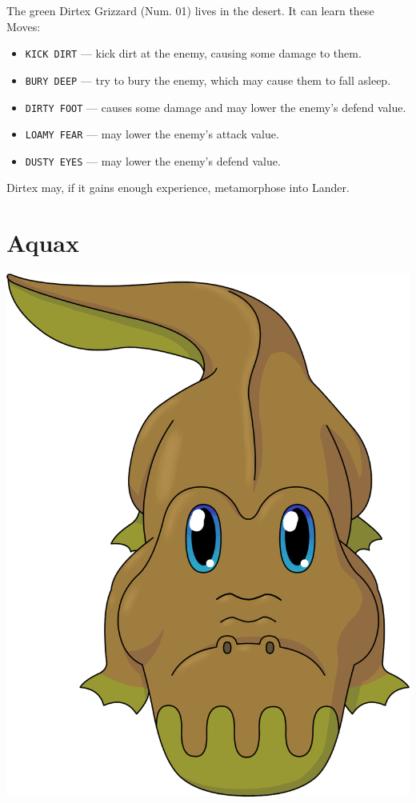 \documentclass[10pt,twocolumn,openany,article]{memoir}
\begin{document}
The green  Dirtex Grizzard (Num. 01)  lives in the desert.  It can learn
these Moves:

\begin{itemize}
\item \texttt{KICK DIRT} --- kick dirt at the enemy, causing some damage
  to them.
\item \texttt{BURY DEEP} --- try to bury the enemy, which may cause them
  to fall asleep.
\item  \texttt{DIRTY FOOT}  --- causes  some  damage and  may lower  the
  enemy's defend value.
\item \texttt{LOAMY FEAR} --- may lower the enemy's attack value.
\item \texttt{DUSTY EYES} --- may lower the enemy's defend value.
\end{itemize}

Dirtex may, if it gains enough experience, metamorphose into Lander.

\fi

\section{Aquax}

\includegraphics[width=\columnwidth]{../Manual/Aquax.png}
\end{document}
